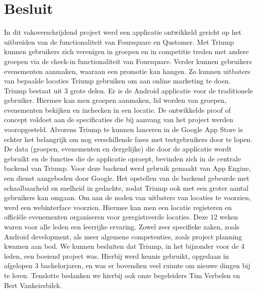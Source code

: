 
\chapter{Besluit}%

In dit vakoverschrijdend project werd een applicatie ontwikkeld gericht op het uitbreiden van de functionaliteit van Foursquare en Qustomer.
Met Triump kunnen gebruikers zich verenigen in groepen en in competitie treden met andere groepen via de check-in functionaliteit van Foursquare.
Verder kunnen gebruikers evenementen aanmaken, waaraan een promotie kan hangen. Zo kunnen uitbaters van bepaalde locaties Triump gebruiken om aan online marketing te doen.
Triump bestaat uit 3 grote delen.
Er is de Android applicatie voor de traditionele gebruiker. Hiermee kan men groepen aanmaken, lid worden van groepen, evenementen bekijken en inchecken in een locatie.
De ontwikkelde proof of concept voldoet aan de specificaties die bij aanvang van het project werden vooropgesteld. Alvorens Triump te kunnen lanceren in de Google App Store is echter het belangrijk om nog verschillende fases met testgebruikers door te lopen.
De data (groepen, evenementen en dergelijke) die door de applicatie wordt gebruikt en de functies die de applicatie oproept, bevinden zich in de centrale backend van Triump.
Voor deze backend werd gebruik gemaakt van App Engine, een dienst aangeboden door Google.
Het opstellen van de backend gebeurde met schaalbaarheid en snelheid in gedachte, zodat Triump ook met een groter aantal gebruikers kan omgaan.
Om aan de noden van uitbaters van locaties te voorzien, werd een webinterface voorzien. 
Hiermee kan men een locatie registeren en officiële evenementen organiseren voor geregistreerde locaties.
Deze 12 weken waren voor alle leden een leerrijke ervaring. Zowel zeer specifieke zaken, zoals Android development, als meer algemene competenties, zoals project planning kwamen aan bod.
We kunnen besluiten dat Triump, in het bijzonder voor de 4 leden, een boeiend project was. Hierbij werd kennis gebruikt, opgedaan in afgelopen 3 bachelorjaren, en was er bovendien veel ruimte om nieuwe dingen bij te leren.
Tenslotte bedanken we hierbij ook onze begeleiders Tim Verbelen en Bert Vankeirsbilck.